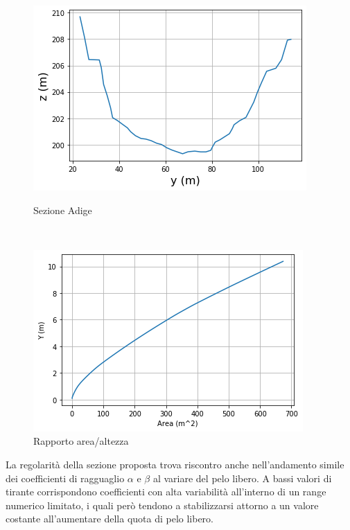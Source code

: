 \documentclass[12pt]{article} %
\begin{document}
\begin{figure}[H]
\begin{minipage}[b]{8.5cm}
\centering
    \includegraphics[width=1 \textwidth]{sezioneadi.png}
    \caption{Sezione Adige}
    \label{fig:Adige_sezione}
\end{minipage}
\ \hspace{2mm} \hspace{3mm} \
\begin{minipage}[b]{8.5cm}
    \centering
    \includegraphics[width=1 \textwidth]{rapporto area altezzaadi.png}
    \caption{Rapporto area/altezza}
    \label{fig:Adige_area/altezza}
\end{minipage}
\end{figure}

\noindent La regolarità della sezione proposta trova riscontro anche nell’andamento simile dei coefficienti di ragguaglio $\alpha$ e $\beta$ al variare del pelo libero. A bassi valori di tirante corrispondono coefficienti con alta variabilità all’interno di un range numerico limitato, i quali però tendono a stabilizzarsi attorno a un valore costante all’aumentare della quota di pelo libero.
\end{document}

